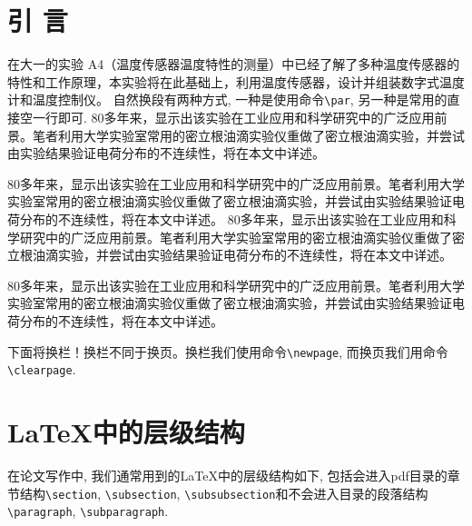 \documentclass[10pt,a4paper,twocolumn,twoside,UTF8]{ctexart}
\begin{document}
\section{引 \quad 言}
在大一的实验 A4（温度传感器温度特性的测量）\cite{shenhan2015}中已经了解了多种温度传感器的特性和工作原理，本实验将在此基础上，利用温度传感器，设计并组装数字式温度计和温度控制仪。
自然换段有两种方式, 一种是使用命令\lstinline|\par|, 另一种是常用的直接空一行即可.
80多年来，显示出该实验在工业应用和科学研究中的广泛应用前景。笔者利用大学实验室常用的密立根油滴实验仪重做了密立根油滴实验，并尝试由实验结果验证电荷分布的不连续性，将在本文中详述。\par
80多年来，显示出该实验在工业应用和科学研究中的广泛应用前景。笔者利用大学实验室常用的密立根油滴实验仪重做了密立根油滴实验，并尝试由实验结果验证电荷分布的不连续性，将在本文中详述。
80多年来，显示出该实验在工业应用和科学研究中的广泛应用前景。笔者利用大学实验室常用的密立根油滴实验仪重做了密立根油滴实验，并尝试由实验结果验证电荷分布的不连续性，将在本文中详述。

80多年来，显示出该实验在工业应用和科学研究中的广泛应用前景。笔者利用大学实验室常用的密立根油滴实验仪重做了密立根油滴实验，并尝试由实验结果验证电荷分布的不连续性，将在本文中详述。

下面将换栏！换栏不同于换页。换栏我们使用命令\lstinline|\newpage|, 而换页我们用命令\lstinline|\clearpage|.
\newpage

\section{\LaTeX 中的层级结构}
在论文写作中, 我们通常用到的\LaTeX 中的层级结构如下, 包括会进入pdf目录的章节结构\lstinline|\section|, \lstinline|\subsection|, \lstinline|\subsubsection|和不会进入目录的段落结构\lstinline|\paragraph|, \lstinline|\subparagraph|.
\end{document}
